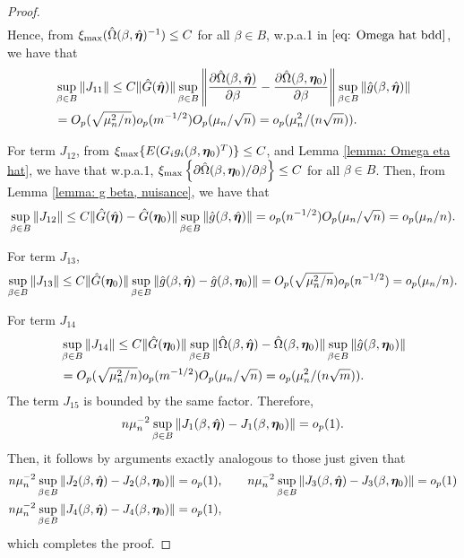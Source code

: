 \documentclass[12pt]{article}
\begin{document}
{\begin{proof}
\begin{align*}
\end{align*}
Hence, from $  \xi_{\max} (\hat\Omega(\beta, \hat{\bm \eta})^{-1}) \leq C$  for all $ \beta\in B $, w.p.a.1 in $ \eqref{eq: Omega hat bdd} $, we have that 
	\begin{align*}
&\sup_{\beta\in B}	\|J_{11}\| \leq C \|\hat G(\hat{\bm \eta})\| \sup_{\beta\in B}  \left\| \frac{\partial \hat \Omega(\beta, \hat {\bm \eta})}{\partial \beta} -  \frac{\partial \hat\Omega(\beta, \bm \eta_0)}{\partial \beta}  \right\| \sup_{\beta\in B} \|\hat g(\beta, \hat{\bm \eta})\| \\
&= O_p(\sqrt{\mu_n^2/n})  o_p(m^{-1/2}) O_p(\mu_n/\sqrt{n})  = o_p(\mu_n^2/(n\sqrt{m})). 
\end{align*}

For term $ J_{12} $, from $ \xi_{\max} \{ E(G_ig_i(\beta, \bm \eta_0)^T)\}\leq C $, and Lemma \ref{lemma: Omega eta hat},  
we have that w.p.a.1, $ \xi_{\max}\left\{  \partial \hat\Omega(\beta, \bm \eta_0)/\partial \beta \right\} \leq C $ for all $ \beta\in B $. Then, from Lemma \ref{lemma: g beta, nuisance}, we have that 
	\begin{align*}
	\sup_{\beta\in B}	\|J_{12}\| \leq  C\| \hat G(\hat {\bm \eta}) - \hat G(\bm \eta_0) \| \sup_{\beta\in B}  \|\hat g(\beta, \hat{\bm \eta})\| =  o_p (n^{-1/2}) O_p(\mu_n/\sqrt{n})  = o_p(\mu_n/n). 
 \end{align*}

For term $ J_{13} $, 
\begin{align*}
\sup_{\beta\in B}	\|J_{13}\|  \leq  C \|	\hat G(\bm \eta_0) \| \sup_{\beta\in B} \|\hat g(\beta, \hat{\bm \eta}) - \hat g(\beta, \bm \eta_0) \|= O_p(\sqrt{\mu_n^2/n}) o_p(n^{-1/2}) = o_p(\mu_n/n). 
\end{align*}

For term $ J_{14} $ 
\begin{align*}
	&\sup_{\beta\in B}	\|J_{14}\|  \leq C \| \hat G(\bm \eta_0)\|   \sup_{\beta\in B}   \|\hat\Omega(\beta, \hat{\bm \eta}) - \hat\Omega(\beta, \bm \eta_0)\|  \sup_{\beta\in B}  \|\hat g(\beta, \bm \eta_0) \| \\
	&=  O_p(\sqrt{\mu_n^2/n}) o_p(m^{-1/2})  O_p(\mu_n/\sqrt{n})  = o_p(\mu_n^2/(n\sqrt{m})).
\end{align*}
The term  $ J_{15} $ is  bounded by the same factor. Therefore, 
\begin{align*}
n \mu_n^{-2}\sup_{\beta\in B}\| J_1(\beta, \hat{\bm \eta})- 	J_1(\beta, \bm \eta_0)  \| = o_p(1). 
\end{align*}
Then, it follows by arguments exactly analogous to those just given that 
\begin{align*}
	&n \mu_n^{-2}\sup_{\beta\in B}\| J_2(\beta, \hat{\bm \eta})- 	J_2(\beta, \bm \eta_0)  \| = o_p(1), \qquad 	n \mu_n^{-2}\sup_{\beta\in B}\| J_3(\beta, \hat{\bm \eta})- 	J_3(\beta, \bm \eta_0)  \| = o_p(1) \\
	&n \mu_n^{-2}\sup_{\beta\in B}\| J_4(\beta, \hat{\bm \eta})- 	J_4(\beta, \bm \eta_0)  \| = o_p(1), 
\end{align*}
which completes the proof. 




\end{proof}}
\end{document}
